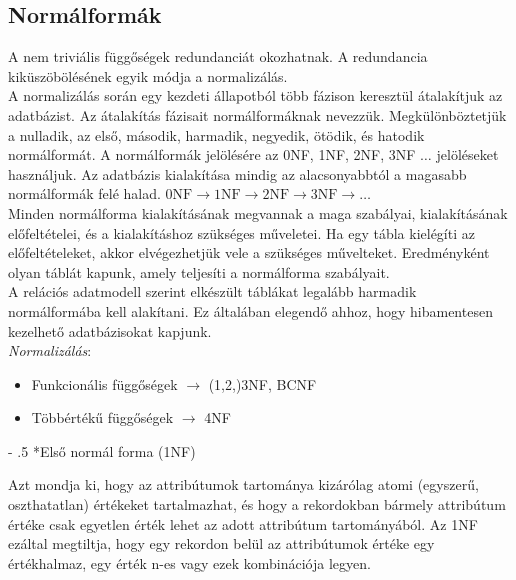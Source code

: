 \documentclass[tikz,12pt,margin=0px]{article}
\makeatletter
\renewcommand\paragraph{%
	\@startsection{paragraph}{4}{0mm}%
	{-\baselineskip}%
	{.5\baselineskip}%
	{\normalfont\normalsize\bfseries}}
\makeatother
\begin{document}
{    \subsection*{Normálformák}

    \noindent A nem triviális függőségek redundanciát okozhatnak. A redundancia kiküszöbölésének egyik módja a normalizálás.\\

    \noindent A normalizálás során egy kezdeti állapotból több fázison keresztül átalakítjuk az adatbázist. Az átalakítás fázisait normálformáknak nevezzük. Megkülönböztetjük a nulladik, az első, második, harmadik, negyedik, ötödik, és hatodik normálformát. A normálformák jelölésére az 0NF, 1NF, 2NF, 3NF $\ldots$ jelöléseket használjuk. Az adatbázis kialakítása mindig az alacsonyabbtól a magasabb normálformák felé halad. $\text{0NF} \rightarrow \text{1NF} \rightarrow \text{2NF} \rightarrow \text{3NF} \rightarrow \ldots$\\

    \noindent Minden normálforma kialakításának megvannak a maga szabályai, kialakításának előfeltételei, és a kialakításhoz szükséges műveletei. Ha egy tábla kielégíti az előfeltételeket, akkor elvégezhetjük vele a szükséges művelteket. Eredményként olyan táblát kapunk, amely teljesíti a normálforma szabályait.\\

    \noindent A relációs adatmodell szerint elkészült táblákat legalább harmadik normálformába kell alakítani. Ez általában elegendő ahhoz, hogy hibamentesen kezelhető adatbázisokat kapjunk.\\

	\noindent \emph{Normalizálás}:
    \begin{itemize}
        \item Funkcionális függőségek $\to$ (1,2,)3NF, BCNF
        \item Többértékű függőségek $\to$ 4NF
    \end{itemize}

    \paragraph*{Első normál forma (1NF)\\}

    \noindent Azt mondja ki, hogy az attribútumok tartománya kizárólag atomi (egyszerű, oszthatatlan) értékeket tartalmazhat, és hogy a rekordokban bármely attribútum értéke csak egyetlen érték lehet az adott attribútum tartományából. Az 1NF ezáltal megtiltja, hogy egy rekordon belül az attribútumok értéke egy értékhalmaz, egy érték n-es vagy ezek kombinációja legyen.\\

}
\end{document}
